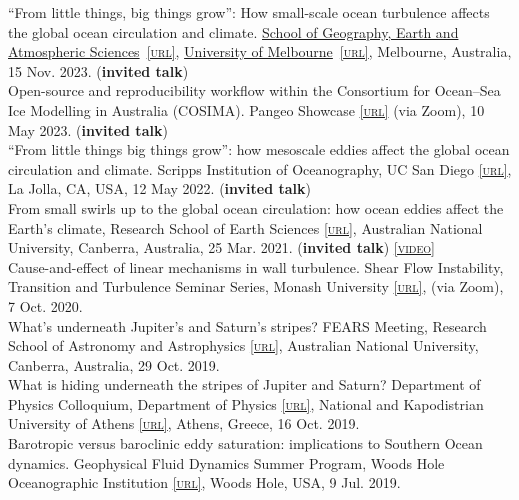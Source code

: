 \documentclass[10pt, letter]{article}
\def\www{http://www.navidconstantinou.com}
\newcommand{\html}[1]{\href{#1}{\scriptsize\textsc{[url]}}}
\newcommand{\sgeas}{
\href{https://sgeas.unimelb.edu.au}{\color{black}School of Geography, Earth and Atmospheric Sciences}}
\newcommand{\unimelb}{
\href{https://www.unimelb.edu.au}{\color{black}University of Melbourne}}
\newcommand{\years}[1]{\marginnote{\scriptsize #1}}
\begin{document}
``From little things, big things grow'': How small-scale ocean turbulence affects the global ocean circulation and climate. \sgeas~\html{https://www.unimelb.edu.au}, \unimelb~\html{https://sgeas.unimelb.edu.au}, Melbourne, Australia, 15 Nov. 2023. (\textbf{invited talk}) \\[.2cm]
\years{2023} Open-source and reproducibility workflow within the Consortium for Ocean--Sea Ice Modelling in Australia (COSIMA). Pangeo Showcase \html{https://pangeo.io/pangeo-showcase.html} (via Zoom), 10 May 2023. (\textbf{invited talk}) \\[.2cm]
\years{2022} “From little things big things grow”: how mesoscale eddies affect the global ocean circulation and climate. Scripps Institution of Oceanography, UC San Diego \html{https://scripps.ucsd.edu/}, La Jolla, CA, USA, 12 May 2022. (\textbf{invited talk}) \\[.2cm]
\years{2021} From small swirls up to the global ocean circulation: how ocean eddies affect the Earth’s climate, Research School of Earth Sciences \html{https://earthsciences.anu.edu.au/}, Australian National University, Canberra, Australia, 25 Mar. 2021. (\textbf{invited talk}) \href{\www/presentations/RSES-EddiesClimate_Mar2021.pdf}{{}} \href{https://www.youtube.com/watch?v=PPz8bD-vJmI&list=PLyZME1ti5Gk3RzPpheCQmtA7XUlqNT7LY&index=25}{\scriptsize\textsc{[video]}}\\[.2cm]
\years{2020} Cause-and-effect of linear mechanisms in wall turbulence. Shear Flow Instability, Transition and Turbulence Seminar Series, Monash University \html{https://www.monash.edu}, (via Zoom), 7 Oct. 2020.  \href{\www/presentations/Monash-ShearTurbulence-Oct2020.pdf}{{}}\\[.2cm]
What's underneath Jupiter's and Saturn's stripes? FEARS Meeting, Research School of Astronomy and Astrophysics \html{http://rsaa.anu.edu.au/}, Australian National University, Canberra, Australia, 29 Oct. 2019. \href{\www/presentations/RSAA-MagneticViscosity_Oct2019.pdf}{{}}\\[.2cm]
What is hiding underneath the stripes of Jupiter and Saturn? Department of Physics Colloquium, Department of Physics \html{http://en.phys.uoa.gr/}, National and Kapodistrian University of Athens \html{http://en.uoa.gr/}, Athens, Greece, 16 Oct. 2019. \href{\www/presentations/UoA-MagneticViscosity_Oct2019.pdf}{{}}\\[.2cm]
Barotropic versus baroclinic eddy saturation: implications to Southern Ocean dynamics. Geophysical Fluid Dynamics Summer Program, Woods Hole Oceanographic Institution \html{https://www.whoi.edu/gfd}, Woods Hole, USA, 9 Jul. 2019. \href{\www/presentations/EddySaturation-GFD-2019.pdf}{{}}\\[.2cm]
\end{document}
